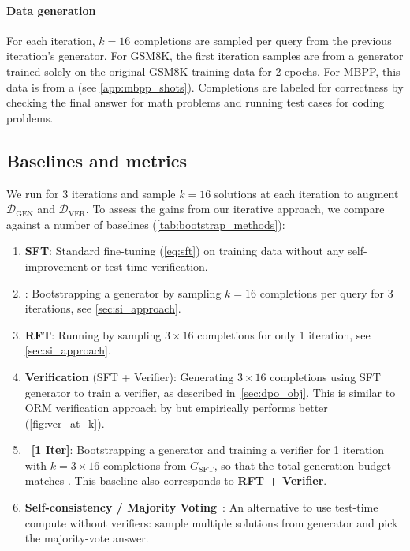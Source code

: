 \paragraph{Data generation} For each iteration, $k=16$ completions are sampled per query from the previous iteration's generator.
For GSM8K, the first iteration samples are from a generator trained solely on the original GSM8K training data for 2 epochs. For MBPP, this data is from a  (see \autoref{app:mbpp_shots}).
Completions are labeled for correctness by checking the final answer for math problems and running test cases for coding problems.%



\subsection{Baselines and metrics}
\label{sec:baselines}

We run \vstar{} for 3 iterations and sample $k=16$ solutions at each iteration to augment $\mathcal{D}_{\text{GEN}}$ and $\mathcal{D}_{\text{VER}}$. To assess the gains from our iterative approach, we compare against a number of baselines (\autoref{tab:bootstrap_methods}):
\begin{enumerate}[label=\arabic*.,left=0pt,nosep]
\item \textbf{SFT}: Standard fine-tuning (\autoref{eq:sft}) on training data without any self-improvement or test-time verification.
\item \textbf{\stardag}: Bootstrapping a generator by sampling $k=16$ completions per query for 3 iterations, see \autoref{sec:si_approach}.

\item \textbf{RFT}: Running \stardag by sampling $3\times16$ completions for only 1 iteration, see \autoref{sec:si_approach}.

\item \textbf{Verification} (SFT + Verifier): Generating $3\times16$ completions using SFT generator to train a verifier, as described in~\autoref{sec:dpo_obj}. This is similar to ORM verification approach by \citep{DBLP:journals/corr/abs-2110-14168} but empirically performs better (\autoref{fig:ver_at_k}).

\item \textbf{\vstar~[1 Iter]}: Bootstrapping a generator and training a verifier for 1 iteration with $k = 3\times16$ completions from $G_{\text{SFT}}$, so that the total generation budget matches \vstar. This baseline also corresponds  to \textbf{RFT + Verifier}.

\item \textbf{Self-consistency / Majority Voting}~\citep{wang2023making}: An alternative to use test-time compute without verifiers: sample multiple solutions from \stardag generator and pick the majority-vote answer.

\end{enumerate}



